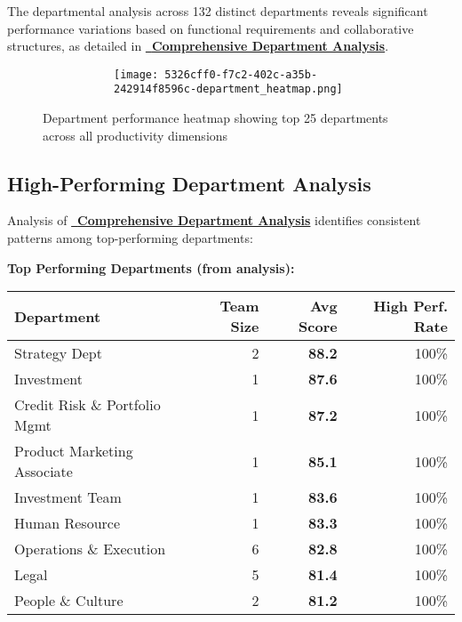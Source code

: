 \documentclass[12pt,a4paper]{article}
\begin{document}
The departmental analysis across 132 distinct departments reveals significant performance variations based on functional requirements and collaborative structures, as detailed in \textcolor{primaryBlue}{\href{https://fixysaskihumorizijuv.supabase.co/storage/v1/object/public/research-files/c063886e-6e70-476c-b87d-de0dc3c0f2b9-comprehensive_department_analysis.csv?download=}{{\normalsize\faBuilding}\, \textbf{Comprehensive Department Analysis}}}.

\begin{figure}[H]
\centering
\begin{figure}
    \centering
    \begin{figure}
        \centering
        \texttt{[image: 5326cff0-f7c2-402c-a35b-242914f8596c-department\_heatmap.png]}
    \end{figure}
\end{figure}
\caption{Department performance heatmap showing top 25 departments across all productivity dimensions}
\label{fig:dept_heatmap}
\end{figure}


\newpage
\subsection{High-Performing Department Analysis}

Analysis of \textcolor{primaryBlue}{\href{https://fixysaskihumorizijuv.supabase.co/storage/v1/object/public/research-files/c063886e-6e70-476c-b87d-de0dc3c0f2b9-comprehensive_department_analysis.csv?download=}{{\normalsize\faBuilding}\, \textbf{Comprehensive Department Analysis}}} identifies consistent patterns among top-performing departments:

\begin{statsbox}
\textbf{\faTrophy \quad Top Performing Departments (from analysis):}
\begin{center}
\begin{tabular}{@{}lrrr@{}}
\textbf{\color{primaryGold}Department} & \textbf{Team Size} & \textbf{Avg Score} & \textbf{High Perf. Rate} \\
\midrule
Strategy Dept & 2 & \textbf{88.2} & 100\% \\
Investment & 1 & \textbf{87.6} & 100\% \\
Credit Risk \& Portfolio Mgmt & 1 & \textbf{87.2} & 100\% \\
Product Marketing Associate & 1 & \textbf{85.1} & 100\% \\
Investment Team & 1 & \textbf{83.6} & 100\% \\
Human Resource & 1 & \textbf{83.3} & 100\% \\
Operations \& Execution & 6 & \textbf{82.8} & 100\% \\
Legal & 5 & \textbf{81.4} & 100\% \\
People \& Culture & 2 & \textbf{81.2} & 100\% \\
\end{tabular}
\end{center}
\end{statsbox}
\end{document}
